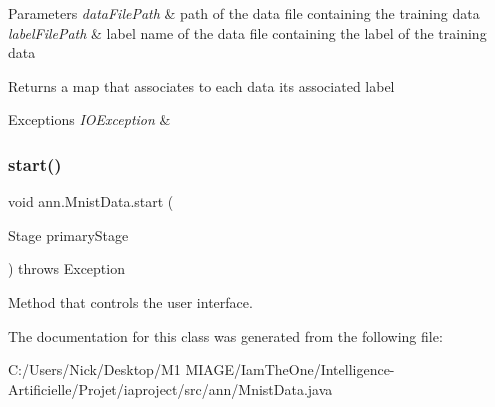 \begin{DoxyParams}{Parameters}
{\em data\+File\+Path} & path of the data file containing the training data \\
\hline
{\em label\+File\+Path} & label name of the data file containing the label of the training data \\
\hline
\end{DoxyParams}
\begin{DoxyReturn}{Returns}
a map that associates to each data its associated label 
\end{DoxyReturn}

\begin{DoxyExceptions}{Exceptions}
{\em I\+O\+Exception} & \\
\hline
\end{DoxyExceptions}
\mbox{\label{classann_1_1_mnist_data_a163423e53cf98cbc9c7517f40a1a2476}} 
\subsubsection{\texorpdfstring{start()}{start()}}
{\footnotesize\ttfamily void ann.\+Mnist\+Data.\+start (\begin{DoxyParamCaption}\item[{Stage}]{primary\+Stage }\end{DoxyParamCaption}) throws Exception}

Method that controls the user interface. 

The documentation for this class was generated from the following file\+:\begin{DoxyCompactItemize}
\item 
C\+:/\+Users/\+Nick/\+Desktop/\+M1 M\+I\+A\+G\+E/\+Iam\+The\+One/\+Intelligence-\/\+Artificielle/\+Projet/iaproject/src/ann/Mnist\+Data.\+java\end{DoxyCompactItemize}
